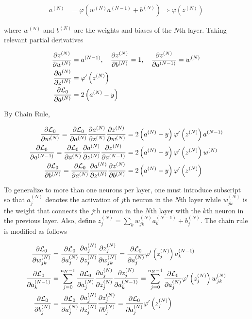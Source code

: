 \begin{align}
    a^{(N)} & = \varphi \left( w^{(N)} a^{(N-1)} + b^{(N)} \right)
    \Longrightarrow
    \varphi
    \left( z^{(N)} \right)
\end{align}

where $w^{(N)}$ and $b^{(N)}$ are the weights and biases of the $N$th layer.
Taking relevant partial derivatives

\begin{align}
    \pdv{z^{(N)}}{w^{(N)}}       & = a^{(N-1)}, \quad \pdv{z^{(N)}}{b^{(N)}}
    =1,
    \quad \pdv{z^{(N)}}{a^{(N-1)}} = w^{(N)}                                 \\
    \pdv{a^{(N)}}{z^{(N)}}       & = \varphi'
    \left( z^{(N)} \right)                                                   \\
    \pdv{\mathcal{L}_0}{a^{(N)}} & = 2 \left(a^{(N)} - y \right)
\end{align}

By Chain Rule,

\begin{align}
    \pdv{\mathcal{L}_0}{w^{(N)}}		      =
    \pdv{\mathcal{L}_0}{a^{(N)}}
    \pdv{a^{(N)}}{z^{(N)}} \pdv{z^{(N)}}{w^{(N)}}    & = 2 \left(a^{(N)} - y
    \right)
    \varphi'
    \left( z^{(N)} \right)  a^{(N-1)}
    \\
    \pdv{\mathcal{L}_0}{a^{(N-1)}}		      =
    \pdv{\mathcal{L}_0}{a^{(N)}}
    \pdv{a^{(N)}}{z^{(N)}} \pdv{z^{(N)}}{a^{(N-1)} } & = 2 \left(a^{(N)} - y
    \right)
    \varphi'
    \left( z^{(N)} \right)  w^{(N)}
    \\
    \pdv{\mathcal{L}_0}{b^{(N)}}		      =
    \pdv{\mathcal{L}_0}{a^{(N)}}
    \pdv{a^{(N)}}{z^{(N)}} \pdv{z^{(N)}}{b^{(N)}}    & = 2 \left(a^{(N)} - y
    \right)
    \varphi'
    \left( z^{(N)} \right)
\end{align}

To generalize to more than one neurons per layer, one must introduce subscript
so that $a^{(N)}_j$ denotes the activation of  $j$th neuron in the $N$th layer
while $w^{(N)}_{jk}$ is the weight that connects the $j$th neuron in the $N$th
layer with the $k$th neuron in the previous layer. Also, define $z^{(N)}_j =
    \sum_k
    w^{(N)}_{jk} a^{(N-1)}_k + b^{(N)}_j$. The chain rule is modified as
follows

\begin{align}
    \pdv{\mathcal{L}_0}{w^{(N)}_{jk}} & =
    \pdv{\mathcal{L}_0}{a^{(N)}_j}
    \pdv{a^{(N)}_j}{z^{(N)}_j} \pdv{z^{(N)}_j}{w^{(N)}_{jk}}  =
    \pdv{\mathcal{L}_0}{a^{(N)}_j}
    \varphi'
    \left( z^{(N)}_j \right)  a^{(N-1)}_k
    \label{eq:back_prop1}
    \\
    \pdv{\mathcal{L}_0}{a^{(N-1)}_k}  & = \sum_{j=0}^{n_N-1}
    \pdv{\mathcal{L}_0}{a^{(N)}_j}
    \pdv{a^{(N)}_j}{z^{(N)}_j} \pdv{z^{(N)}_j}{a^{(N-1)}_k }  =
    \sum_{j=0}^{n_N-1} \pdv{\mathcal{L}_0}{a^{(N)}_j}
    \varphi'
    \left( z^{(N)}_j \right)  w^{(N)}_{jk}
    \label{eq:back_prop2}
    \\
    \pdv{\mathcal{L}_0}{b^{(N)}_j}    & =
    \pdv{\mathcal{L}_0}{a^{(N)}_j}
    \pdv{a^{(N)}_j}{z^{(N)}_j} \pdv{z^{(N)}_j}{b^{(N)}_j}     =
    \pdv{\mathcal{L}_0}{a^{(N)}_j}
    \varphi'
    \left( z^{(N)}_j \right)
\end{align}

